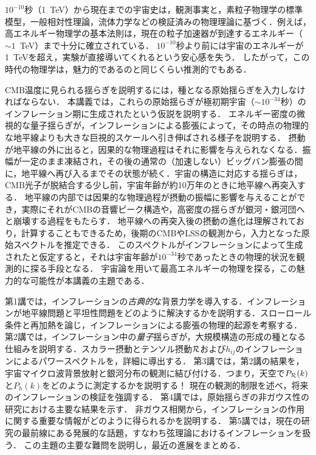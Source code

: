 
$10^{-10}$秒（1~TeV）から現在までの宇宙史は，観測事実と，素粒子物理学の標準模型，一般相対性理論，流体力学などの検証済みの物理理論に基づく．例えば，高エネルギー物理学の基本法則は，現在の粒子加速器が到達するエネルギー（$\sim 1$~TeV）まで十分に確立されている．
$10^{-10}$秒より前には宇宙のエネルギーが1~TeVを超え，実験が直接導いてくれるという安心感を失う．
したがって，この時代の物理学は，魅力的であるのと同じくらい推測的でもある．

CMB温度に見られる揺らぎを説明するには，種となる原始揺らぎを入力しなければならない．
本講義では，これらの原始揺らぎが極初期宇宙（$\sim 10^{-34}$秒）のインフレーション期に生成されたという仮説を説明する．
エネルギー密度の微視的な量子揺らぎが，インフレーションによる膨張によって，その時点の物理的な地平線よりも大きな巨視的スケールへ引き伸ばされる様子を説明する．
摂動が地平線の外に出ると，因果的な物理過程はそれに影響を与えられなくなる．振幅が一定のまま凍結され，その後の通常の（加速しない）ビッグバン膨張の間に，地平線へ再び入るまでその状態が続く．宇宙の構造に対応する揺らぎは，CMB光子が脱結合する少し前，宇宙年齢が約10万年のときに地平線へ再突入する．
地平線の内部では因果的な物理過程が摂動の振幅に影響を与えることができ，実際にそれがCMBの音響ピーク構造や，高密度の揺らぎが銀河・銀河団へと崩壊する過程をもたらす．
地平線への再突入後の摂動の進化は理解されており，計算することもできるため，後期のCMBやLSSの観測から，入力となった原始スペクトルを推定できる．
このスペクトルがインフレーションによって生成されたと仮定すると，それは宇宙年齢が$10^{-34}$秒であったときの物理的状況を観測的に探る手段となる．
宇宙論を用いて最高エネルギーの物理を探る，この魅力的な可能性が本講義の主題である．


{第1講}では，インフレーションの{\it 古典的}な背景力学を導入する．インフレーションが地平線問題と平坦性問題をどのように解決するかを説明する．スローロール条件と再加熱を論じ，インフレーションによる膨張の物理的起源を考察する．
{第2講}では，インフレーション中の{\it 量子}揺らぎが，大規模構造の形成の種となる仕組みを説明する．スカラー摂動とテンソル摂動${\cal R}$および$h_{ij}$のインフレーションによるパワースペクトルを，詳細に導出する．
{第3講}では，第2講の結果を，宇宙マイクロ波背景放射と銀河分布の観測に結び付ける．つまり，天空で$P_{\cal R}(k)$と$P_h(k)$をどのように測定するかを説明する！ 現在の観測的制限を述べ，将来のインフレーションの検証を強調する．
{第4講}では，原始揺らぎの非ガウス性の研究における主要な結果を示す．
非ガウス相関から，インフレーションの作用に関する重要な情報がどのように得られるかを説明する．
{第5講}では，現在の研究の最前線にある発展的な話題，すなわち弦理論におけるインフレーションを扱う．
この主題の主要な難問を説明し，最近の進展をまとめる．

